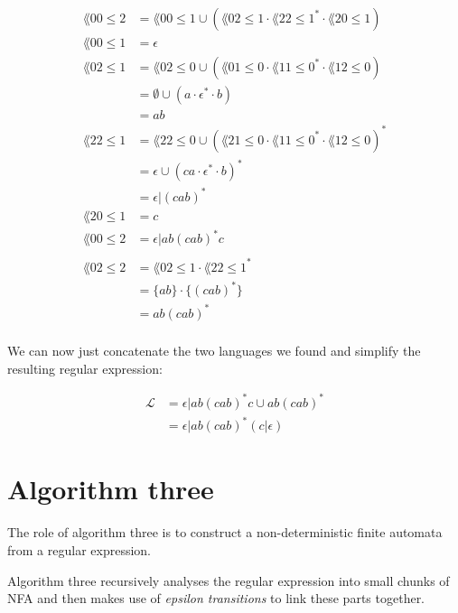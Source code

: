 \[
  \begin{split}
    \lang{0}{0}{\leq 2} &= \lang{0}{0}{\leq 1} \cup \left( \lang{0}{2}{\leq 1} \cdot {\lang{2}{2}{\leq 1}}^{*} \cdot \lang{2}{0}{\leq 1} \right)\\
    \lang{0}{0}{\leq 1} &= \epsilon\\
    \lang{0}{2}{\leq 1} &= \lang{0}{2}{\leq 0} \cup \left( \lang{0}{1}{\leq 0} \cdot {\lang{1}{1}{\leq 0}}^{*} \cdot \lang{1}{2}{\leq 0} \right)\\
              &= \emptyset \cup \left( a \cdot \epsilon^*  \cdot b \right)\\
              &= ab\\
    \lang{2}{2}{\leq 1} &= \lang{2}{2}{\leq 0} \cup \left( \lang{2}{1}{\leq 0} \cdot {\lang{1}{1}{\leq 0}}^{*} \cdot \lang{1}{2}{\leq 0} \right)^*\\
              &= \epsilon \cup \left( ca \cdot \epsilon^* \cdot b \right)^*\\
              &= \epsilon | (cab)^*\\
    \lang{2}{0}{\leq 1} &= c\\
    \lang{0}{0}{\leq 2} &= \epsilon | ab(cab)^*c\\\\
    \lang{0}{2}{\leq 2} &= \lang{0}{2}{\leq 1} \cdot {\lang{2}{2}{\leq 1}}^*\\
              &= \{ab\} \cdot \{(cab)^*\}\\
              &= ab(cab)^*\\
  \end{split}
\]

We can now just concatenate the two languages we found and simplify the
resulting regular expression:

\[
  \begin{split}
    \mathcal{L} &= \epsilon | ab(cab)^*c \cup ab(cab)^*\\
          &= \epsilon | ab(cab)^* (c|\epsilon)
  \end{split}
\]

\section{Algorithm three}

The role of algorithm three is to construct a non-deterministic finite automata
from a regular expression.

Algorithm three recursively analyses the regular expression into small chunks of
NFA and then makes use of {\it epsilon transitions} to link these parts
together. 

